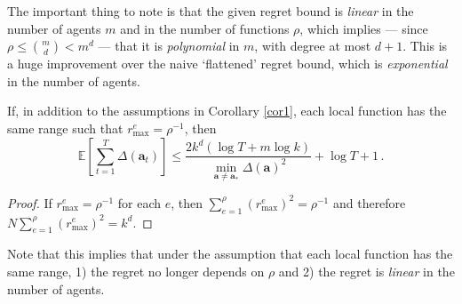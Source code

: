 The important thing to note is that the given regret bound is \emph{linear} in the number of agents $m$ and in the number of functions $\rho$, which implies --- since $\rho \le {m \choose d} < m^d$ --- that it is \emph{polynomial} in $m$, with degree at most $d+1$. This is a huge improvement over the naive `flattened' regret bound, which is \emph{exponential} in the number of agents.
\begin{corollary}
If, in addition to the assumptions in Corollary \ref{cor1}, each local function has the same range such that $r_{\max}^e = \rho^{-1}$, then
\[
\mathbb{E} \left[ \sum_{t=1}^T \Delta(\mathbf{a}_t) \right] \le\frac{2k^d \left( \log T + m \log k \right)}{\min_{\mathbf{a} \neq\mathbf{a}_*} \Delta(\mathbf{a})^2} + \log T + 1\,.
\]
\end{corollary}
\begin{proof}
If $r_{\max}^e = \rho^{-1}$ for each $e$, then $\sum_{e=1}^\rho (r_{\max}^e)^2 = \rho^{-1}$ and therefore $N \sum_{e=1}^\rho (r_{\max}^e)^2 = k^d$.
\end{proof}
Note that this implies that under the assumption that each local function has the same range, 1) the regret no longer depends on $\rho$ and 2) the regret is \emph{linear} in the number of agents.

